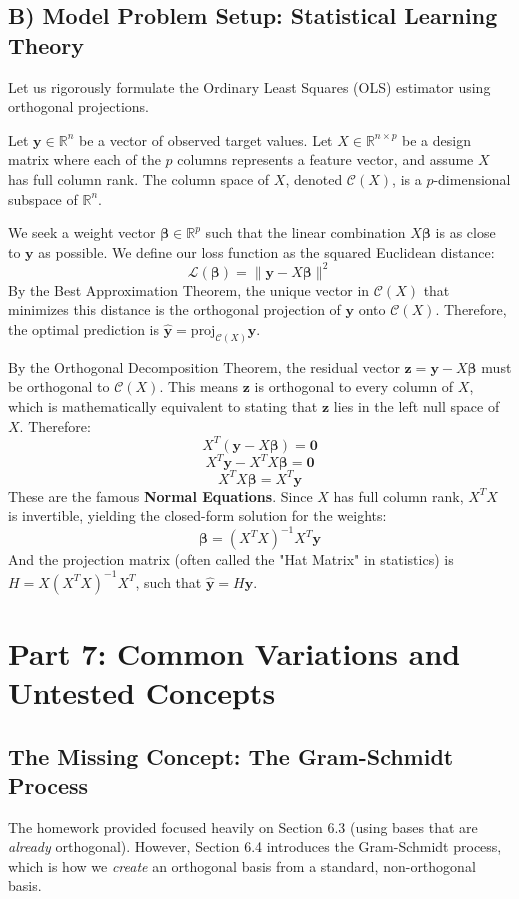\documentclass[11pt, letterpaper]{article}
\theoremstyle{definition}
\theoremstyle{remark}
\newcommand{\R}{\mathbb{R}}
\begin{document}
\subsection{B) Model Problem Setup: Statistical Learning Theory}
Let us rigorously formulate the Ordinary Least Squares (OLS) estimator using orthogonal projections. 

Let $\mathbf{y} \in \R^n$ be a vector of observed target values. Let $X \in \R^{n \times p}$ be a design matrix where each of the $p$ columns represents a feature vector, and assume $X$ has full column rank. The column space of $X$, denoted $\mathcal{C}(X)$, is a $p$-dimensional subspace of $\R^n$.

We seek a weight vector $\boldsymbol{\beta} \in \R^p$ such that the linear combination $X\boldsymbol{\beta}$ is as close to $\mathbf{y}$ as possible. We define our loss function as the squared Euclidean distance:
\[ \mathcal{L}(\boldsymbol{\beta}) = \|\mathbf{y} - X\boldsymbol{\beta}\|^2 \]
By the Best Approximation Theorem, the unique vector in $\mathcal{C}(X)$ that minimizes this distance is the orthogonal projection of $\mathbf{y}$ onto $\mathcal{C}(X)$. Therefore, the optimal prediction is $\hat{\mathbf{y}} = \text{proj}_{\mathcal{C}(X)} \mathbf{y}$.

By the Orthogonal Decomposition Theorem, the residual vector $\mathbf{z} = \mathbf{y} - X\boldsymbol{\beta}$ must be orthogonal to $\mathcal{C}(X)$. This means $\mathbf{z}$ is orthogonal to every column of $X$, which is mathematically equivalent to stating that $\mathbf{z}$ lies in the left null space of $X$. Therefore:
\[ X^T (\mathbf{y} - X\boldsymbol{\beta}) = \mathbf{0} \]
\[ X^T \mathbf{y} - X^T X \boldsymbol{\beta} = \mathbf{0} \]
\[ X^T X \boldsymbol{\beta} = X^T \mathbf{y} \]
These are the famous \textbf{Normal Equations}. Since $X$ has full column rank, $X^T X$ is invertible, yielding the closed-form solution for the weights:
\[ \boldsymbol{\beta} = (X^T X)^{-1} X^T \mathbf{y} \]
And the projection matrix (often called the "Hat Matrix" in statistics) is $H = X(X^T X)^{-1} X^T$, such that $\hat{\mathbf{y}} = H\mathbf{y}$.

\newpage
\section{Part 7: Common Variations and Untested Concepts}

\subsection{The Missing Concept: The Gram-Schmidt Process}
The homework provided focused heavily on Section 6.3 (using bases that are \textit{already} orthogonal). However, Section 6.4 introduces the Gram-Schmidt process, which is how we \textit{create} an orthogonal basis from a standard, non-orthogonal basis.
\end{document}
